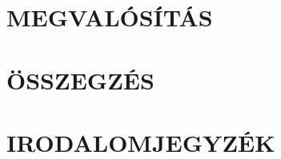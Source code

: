 \documentclass[12pt,a4paper]{article}
\begin{document}
\clearpage
\section{MEGVALÓSÍTÁS}
\label{sec:execution}


\clearpage
\section{ÖSSZEGZÉS}




\clearpage
\section{IRODALOMJEGYZÉK}
\printbibliography[heading=none]

\clearpage
\renewcommand{\listfigurename}{ÁBRAJEGYZÉK}
\listoffigures

\clearpage
\renewcommand{\listtablename}{TÁBLAJEGYZÉK}
\listoftables

\clearpage
\renewcommand{\lstlistlistingname}{FORRÁSKÓDJEGYZÉK}
\lstlistoflistings
\end{document}
